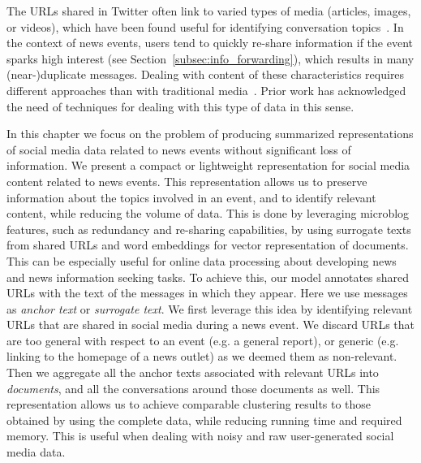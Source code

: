 %
%
The URLs shared in Twitter often link to varied types of media (articles,
images, or videos), which have been found useful for identifying conversation
topics~\cite{mishne2012twanchor}.
%
In the context of news events, users tend to quickly re-share information if the
event sparks high interest (see Section~\ref{subsec:info_forwarding}), which
results in many (near-)duplicate messages.
%
Dealing with content of these characteristics requires different approaches
than with traditional media~\cite{Alonso:2017:WHH:3091478.3091484}.
%
Prior work has acknowledged the need of techniques for dealing with this type of
data in this sense.


In this chapter we focus on the problem of producing summarized representations of
social media data related to news events without significant loss of
information.
%
We present a compact or lightweight representation for social media content related to news
events.
%
This representation allows us to preserve information about the topics involved
in an event, and to identify relevant content, while reducing the volume of
data.
%
This is done by leveraging microblog features, such as redundancy
and re-sharing capabilities, by using surrogate texts from shared URLs and 
word embeddings for vector representation of documents.
%
This can be especially useful for online data processing about developing news
and news information seeking tasks.
%
To achieve this, our model annotates shared URLs with the text of the messages
in which they appear.
%
Here we use messages as {\em anchor text} or {\em surrogate text}. 
%
We first leverage this idea by identifying relevant URLs that are shared in
social media during a news event.
%
We discard URLs that are too general with respect to an event (e.g. a general
report), or generic (e.g. linking to the homepage of a news outlet) as we deemed
them as non-relevant.
%
Then we aggregate all the anchor texts associated with relevant URLs into {\em
documents}, and all the conversations around those documents as well. 
%
This representation allows us to achieve comparable clustering results to 
those obtained by using the complete data, while reducing running time and 
required memory.
%
This is useful when dealing with noisy and raw user-generated social media data.



